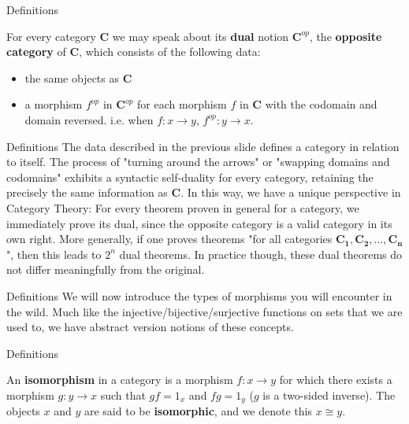 \documentclass[tikz]{beamer}
\theoremstyle{definition}
\begin{document}
\begin{frame}{Definitions}
    \begin{definition}
        For every category $\mathbf{C}$ we may speak about its \textbf{dual} notion $\mathbf{C}^{op}$, the \textbf{opposite category} of $\mathbf{C}$, which consists of the following data:
        \begin{itemize}
            \item the same objects as $\mathbf{C}$
            \item a morphism $f^{op}$ in $\mathbf{C}^{op}$ for each morphism $f$ in $\mathbf{C}$ with the codomain and domain reversed. i.e. when $f: x \to y$, $f^{op} : y \to x$.
        \end{itemize}{}
    \end{definition}{}
\end{frame}{}


\begin{frame}{Definitions}
The data described in the previous slide defines a category in relation to itself. The process of "turning around the arrows" or "swapping domains and codomains" exhibits a syntactic self-duality for every category, retaining the precisely the same information as $\mathbf{C}$. In this way, we have a unique perspective in Category Theory: For every theorem proven in general for a category, we immediately prove its dual, since the opposite category is a valid category in its own right. More generally, if one proves theorems "for all categories $\mathbf{C_1}, \mathbf{C_2}, \ldots , \mathbf{C_n}$", then this leads to $2^n$ dual theorems. In practice though, these dual theorems do not differ meaningfully from the original.

\end{frame}{}

\begin{frame}{Definitions}
    We will now introduce the types of morphisms you will encounter in the wild. Much like the injective/bijective/surjective functions on sets that we are used to, we have abstract version notions of these concepts.
\end{frame}{}

\begin{frame}{Definitions}
    \begin{definition}[Isomorphism]
       An \textbf{isomorphism} in a category is a morphism $f: x \to y$ for which there exists a morphism $g: y \to x$ such that $gf = 1_x$ and $fg = 1_y$ ($g$ is a two-sided inverse). The objects $x$ and $y$ are said to be \textbf{isomorphic}, and we denote this $x \cong y$.
    \end{definition}

\end{frame}{}
\end{document}
